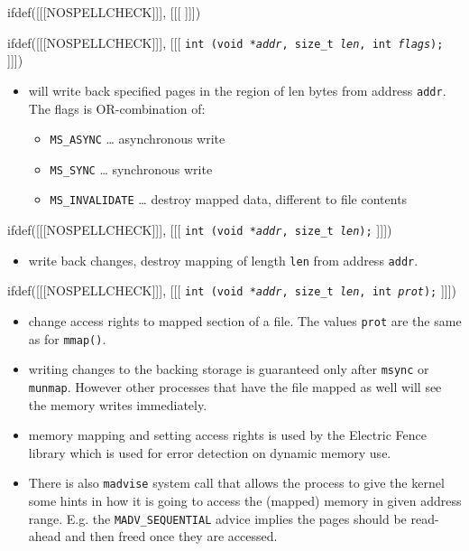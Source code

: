 
ifdef([[[NOSPELLCHECK]]], [[[
]]])

\begin{slide}
ifdef([[[NOSPELLCHECK]]], [[[
\texttt{int (void *\emph{addr}, size\_t \emph{l{}en},
int \emph{flags});}
]]])
\begin{itemize}
\item will write back specified pages in the region of l{}en bytes from address
\texttt{addr}. The flags is OR-combination of:
    \begin{itemize}
    \item \texttt{MS\_ASYNC} \dots{} asynchronous write
    \item \texttt{MS\_SYNC} \dots{} synchronous write
    \item \texttt{MS\_INVALIDATE} \dots{} destroy mapped data,
    different to file contents
    \end{itemize}
\end{itemize}
ifdef([[[NOSPELLCHECK]]], [[[
\texttt{int (void *\emph{addr}, size\_t \emph{l{}en});}
]]])
\begin{itemize}
\item write back changes, destroy mapping of length \texttt{l{}en} from
address \texttt{addr}.
\end{itemize}
ifdef([[[NOSPELLCHECK]]], [[[
\texttt{int (void *\emph{addr}, size\_t \emph{l{}en},
int \emph{prot});}
]]])
\begin{itemize}
\item change access rights to mapped section of a file. The values
\texttt{prot} are the same as for \texttt{mmap()}.
\end{itemize}
\end{slide}

\begin{itemize}
\item writing changes to the backing storage is guaranteed only after
\texttt{msync} or \texttt{munmap}.  However other processes that have the file
mapped as well will see the memory writes immediately.
\item memory mapping and setting access rights is used by the Electric Fence
library which is used for error detection on dynamic memory use.
\item There is also \texttt{madvise} system call that allows the process
to give the kernel some hints in how it is going to access the (mapped) memory
in given address range. E.g. the \texttt{MADV\_SEQUENTIAL} advice implies
the pages should be read-ahead and then freed once they are accessed.
\end{itemize}

